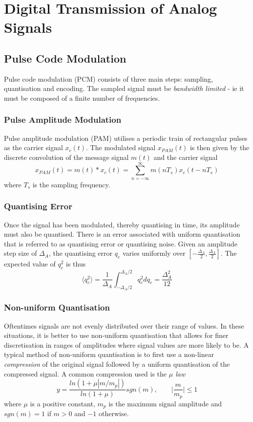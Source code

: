 \documentclass[]{article}
\begin{document}
\section{Digital Transmission of Analog Signals}
\subsection{Pulse Code Modulation}
Pulse code modulation (PCM) consists of three main steps: sampling, quantisation and encoding. The sampled signal must be \textit{bandwidth limited} - ie it must be composed of a finite number of frequencies.
\subsubsection{Pulse Amplitude Modulation}
Pulse amplitude modulation (PAM) utilises a periodic train of rectangular pulses as the carrier signal $x_{c}(t)$. The modulated signal $x_{PAM}(t)$ is then given by the discrete convolution of the message signal $m(t)$ and the carrier signal
\begin{equation} x_{PAM}(t) = m(t)*x_{c}(t) = \sum_{n=-\infty}^{\infty} m(nT_{s})x_{c}(t-nT_{s}) \end{equation}
where $T_{s}$ is the sampling frequency.
\subsubsection{Quantising Error}
Once the signal has been modulated, thereby quantising in time, its amplitude must also be quantised. There is an error associated with uniform quantisation that is referred to as quantising error or quantising noise. Given an amplitude step size of $\Delta_{A}$, the quantising error $q_{e}$ varies uniformly over $[-\frac{\Delta_{A}}{2}, \frac{\Delta_{A}}{2}]$. The expected value of $q_{e}^{2}$ is thus
\begin{equation} \langle q_{e}^{2} \rangle = \frac{1}{\Delta_{A}} \int_{-\Delta_{A}/2}^{\Delta_{A}/2} q_{e}^{2}dq_{e} = \frac{\Delta_{A}^{2}}{12} \end{equation}
\subsubsection{Non-uniform Quantisation}
Oftentimes signals are not evenly distributed over their range of values. In these situations, it is better to use non-uniform quantisation that allows for finer discretisation in ranges of amplitudes where signal values are more likely to be. A typical method of non-uniform quantisation is to first use a non-linear \textit{compression} of the original signal followed by a uniform quantisation of the compressed signal. A common compression used is the \textit{$\mu$ law}
\begin{equation} y = \frac{ln(1+\mu|m/m_{p}|)}{ln(1+\mu)}sgn(m), \qquad \bigg|\frac{m}{m_{p}}\bigg| \leq 1 \end{equation}
where $\mu$ is a positive constant, $m_{p}$ is the maximum signal amplitude and $sgn(m) = 1$ if $m>0$ and $-1$ otherwise.
\end{document}
